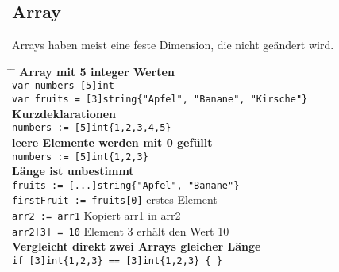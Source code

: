 \documentclass[twoside,a4paper,12pt]{article}
\begin{document}
\subsection{Array}
Arrays haben meist eine feste Dimension, die nicht geändert wird.
\begin{tabbing}
 \hspace{2mm} \= \hspace{50mm} \= \kill
 \> \textbf{Array mit 5 integer Werten} \\
 \> \verb|var numbers [5]int| \\  
 \> \verb|var fruits = [3]string{"Apfel", "Banane", "Kirsche"}| \\ 
 \> \textbf{Kurzdeklarationen} \\ 
 \> \verb|numbers := [5]int{1,2,3,4,5}|  \\ 
 \> \textbf{leere Elemente werden mit 0 gefüllt} \\ 
 \> \verb|numbers := [5]int{1,2,3}| \\ 
 \> \textbf{Länge ist unbestimmt} \\ 
 \> \verb|fruits := [...]string{"Apfel", "Banane"}| \\ 
 \> \verb|firstFruit := fruits[0]| \> erstes Element \\ 
 \> \verb|arr2 := arr1| \> Kopiert arr1 in arr2 \\ 
 \> \verb|arr2[3] = 10| \> Element 3 erhält den Wert 10 \\ 
 \> \textbf{Vergleicht direkt zwei Arrays gleicher Länge}  \\ 
 \> \verb|if [3]int{1,2,3} == [3]int{1,2,3} { }| \\ 
\end{tabbing}
\end{document}
